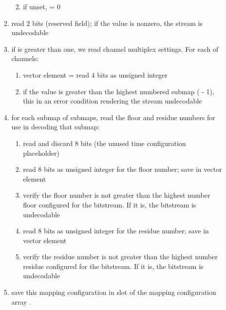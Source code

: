 \begin{enumerate}
\begin{enumerate}
\begin{enumerate}
\begin{enumerate}
\begin{itemize}
           \end{itemize}


         \item if unset,  = 0
       \end{enumerate}


     \item read 2 bits (reserved field); if the value is nonzero, the stream is undecodable
     \item if  is greater than one, we read channel multiplex settings. For each \varname{[j]} of  channels:
      \begin{enumerate}
       \item vector  element \varname{[j]} = read 4 bits as unsigned integer
       \item if the value is greater than the highest numbered submap ( - 1), this in an error condition rendering the stream undecodable
      \end{enumerate}

     \item for each submap \varname{[j]} of  submaps, read the floor and residue numbers for use in decoding that submap:
      \begin{enumerate}
       \item read and discard 8 bits (the unused time configuration placeholder)
       \item read 8 bits as unsigned integer for the floor number; save in vector  element \varname{[j]}
       \item verify the floor number is not greater than the highest number floor configured for the bitstream. If it is, the bitstream is undecodable
       \item read 8 bits as unsigned integer for the residue number; save in vector  element \varname{[j]}
       \item verify the residue number is not greater than the highest number residue configured for the bitstream.  If it is, the bitstream is undecodable
      \end{enumerate}

     \item save this mapping configuration in slot \varname{[i]} of the mapping configuration array .
    \end{enumerate}

  \end{enumerate}

\end{enumerate}



